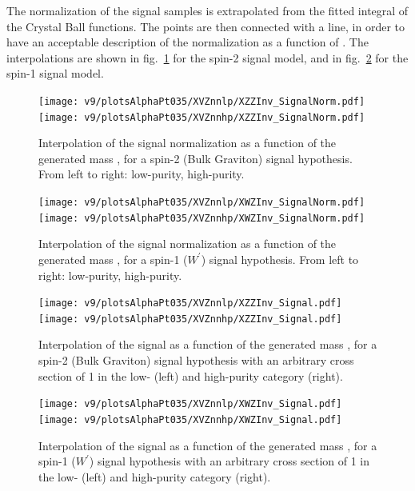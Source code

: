 \noindent The normalization of the signal samples is extrapolated from the fitted integral of the Crystal Ball functions. The points are then connected with a line, in order to have an acceptable description of the normalization as a function of \mtVZ. The interpolations are shown in fig.~\ref{fig:XZZ_SignalNorm} for the spin-2 signal model, and in fig.~\ref{fig:XWZ_SignalNorm} for the spin-1 signal model.%

\begin{figure}[!htb]
  \centering
    \texttt{[image: v9/plotsAlphaPt035/XVZnnlp/XZZInv\_SignalNorm.pdf]}
    \texttt{[image: v9/plotsAlphaPt035/XVZnnhp/XZZInv\_SignalNorm.pdf]}
  \caption{Interpolation of the signal normalization as a function of the generated mass \mtVZ, for a spin-2 (Bulk Graviton) signal hypothesis. From left to right: low-purity, high-purity.}
  \label{fig:XZZ_SignalNorm}
\end{figure}

\begin{figure}[!htb]
  \centering
    \texttt{[image: v9/plotsAlphaPt035/XVZnnlp/XWZInv\_SignalNorm.pdf]}
    \texttt{[image: v9/plotsAlphaPt035/XVZnnhp/XWZInv\_SignalNorm.pdf]}
  \caption{Interpolation of the signal normalization as a function of the generated mass \mtVZ, for a spin-1 ($W^{'}$) signal hypothesis. From left to right: low-purity, high-purity.}
  \label{fig:XWZ_SignalNorm}
\end{figure}

\begin{figure}[!htb]
  \centering
    \texttt{[image: v9/plotsAlphaPt035/XVZnnlp/XZZInv\_Signal.pdf]}
    \texttt{[image: v9/plotsAlphaPt035/XVZnnhp/XZZInv\_Signal.pdf]}
  \caption{Interpolation of the signal as a function of the generated mass \mtVZ, for a spin-2 (Bulk Graviton) signal hypothesis with an arbitrary cross section of 1 \pb in the low- (left) and high-purity category (right).}
  \label{fig:XZZInv_Signal}
\end{figure}

\begin{figure}[!htb]
  \centering
    \texttt{[image: v9/plotsAlphaPt035/XVZnnlp/XWZInv\_Signal.pdf]}
    \texttt{[image: v9/plotsAlphaPt035/XVZnnhp/XWZInv\_Signal.pdf]}
  \caption{Interpolation of the signal as a function of the generated mass \mtVZ, for a spin-1 ($W^{'}$) signal hypothesis with an arbitrary cross section of 1 \pb in the low- (left) and high-purity category (right).}
  \label{fig:XWZInv_Signal}
\end{figure}

\clearpage

